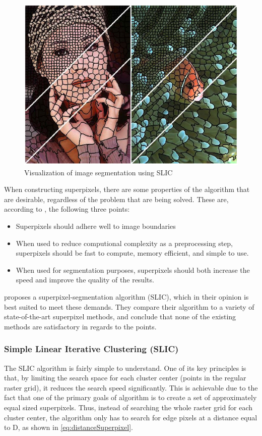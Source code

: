 \begin{figure}[!h]
	\centering
	\includegraphics[scale=0.3]{fig/superpixels}
	\caption{Visualization of image segmentation using SLIC \citep{Achanta2012}}
	\label{fig:superpixels}
\end{figure}

When constructing superpixels, there are some properties of the algorithm that are desirable, regardless of the problem that are being solved. These are, according to \citep{Achanta2012}, the following three points:

\begin{itemize}
	\item Superpixels should adhere well to image boundaries
	\item When used to reduce computional complexity as a preprocessing step, superpixels should be fast to compute, memory efficient, and simple to use.
	\item When used for segmentation purposes, superpixels should both increase the speed and improve the quality of the results.
\end{itemize}

\cite{Achanta2012} proposes a superpixel-segmentation algorithm (SLIC), which in their opinion is best suited to meet these demands. They compare their algorithm to a variety of state-of-the-art superpixel methods, and conclude that none of the existing methods are satisfactory in regards to the points.

\subsubsection{Simple Linear Iterative Clustering (SLIC)}
The SLIC algorithm is fairly simple to understand. One of its key principles is that, by limiting the search space for each cluster center (points in the regular raster grid), it reduces the search speed significantly. This is achievable due to the fact that one of the primary goals of algorithm is to create a set of approximately equal sized superpixels. Thus, instead of searching the whole raster grid for each cluster center, the algorithm only has to search for edge pixels at a distance equal to D, as shown in \autoref{eq:distanceSuperpixel}.


